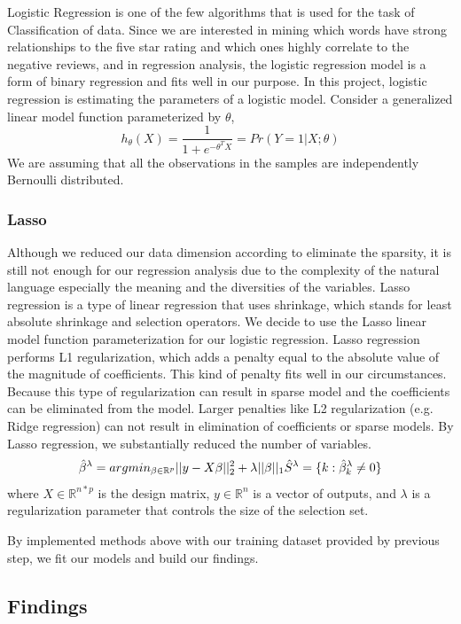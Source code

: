 \documentclass[12pt]{article}
\begin{document}
Logistic Regression is one of the few algorithms that is used for the task of Classification of data. Since we are interested in mining which words have strong relationships to the five star rating and which ones highly correlate to the negative reviews, and in regression analysis, the logistic regression  model is a form of binary regression and fits well in our purpose. In this project, logistic regression is estimating the parameters of a logistic model. Consider a generalized linear model function parameterized by $\theta$, 
$$
h_\theta(X)=\frac{1}{1+e^{-\theta^TX}}=Pr(Y=1|X;\theta)
$$
We are assuming that all the observations in the samples are independently Bernoulli distributed.

\subsubsection{Lasso}

Although we reduced our data dimension according to eliminate the sparsity, it is still not enough for our regression analysis due to the complexity of the natural language especially the meaning and the diversities of the variables. Lasso regression is a type of linear regression that uses shrinkage, which stands for least absolute shrinkage and selection operators. We decide to use the Lasso linear model function parameterization for our logistic regression. Lasso regression performs L1 regularization, which adds a penalty equal to the absolute value of the magnitude of coefficients. This kind of penalty fits well in our circumstances. Because this type of regularization can result in sparse model and the coefficients can be eliminated from the model. Larger penalties like L2 regularization (e.g. Ridge regression) can not result in elimination of coefficients or sparse models. By Lasso regression, we substantially reduced the number of variables.
$$
\hat{\beta}^\lambda = argmin_{\beta \in \mathbb{R}^p} ||y-X\beta||_2^2+\lambda||\beta||_1 \\
\hat{S}^\lambda = \{k:\hat{\beta}_k^\lambda \neq 0\}
$$
where $X \in\mathbb{R} ^{n*p} $ is the design matrix, $y \in \mathbb{R}^n$ is a vector of outputs, and $\lambda$ is a regularization parameter that controls the size of the selection set.

By implemented methods above with our training dataset provided by previous step, we fit our models and build our findings.

\subsection{Findings}
\end{document}
